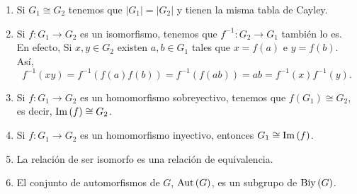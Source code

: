 \begin{observation}
\begin{enumerate}
\item Si $\displaystyle G_{1} \cong G_{2} $ tenemos que $\displaystyle \left|G_{1}\right| = \left|G_{2}\right| $ y tienen la misma tabla de Cayley. 
\item Si $\displaystyle f: G_{1} \to G_{2} $ es un isomorfismo, tenemos que $\displaystyle f^{-1} : G_{2} \to G_{1} $ también lo es. En efecto, Si $\displaystyle x,y \in G_{2} $ existen $\displaystyle a,b \in G_{1} $ tales que $\displaystyle x = f\left(a\right) $ e $\displaystyle y = f\left(b\right) $. Así, 
	\[f^{-1}\left(xy\right) = f^{-1}\left(f\left(a\right)f\left(b\right)\right) = f^{-1}\left(f\left(ab\right)\right) = ab = f^{-1}\left(x\right)f^{-1}\left(y\right).\]
	
\item Si $\displaystyle f: G_{1} \to G_{2} $ es un homomorfismo sobreyectivo, tenemos que $\displaystyle f\left(G_{1}\right) \cong G_{2} $, es decir, $\displaystyle \operatorname{Im}\left(f\right)\cong G_{2} $.
\item Si $\displaystyle f: G_{1} \to G_{2} $ es un homomorfismo inyectivo, entonces $\displaystyle G_{1} \cong \operatorname{Im}\left(f\right) $.
\item La relación de ser isomorfo es una relación de equivalencia.
\item El conjunto de automorfismos de $\displaystyle G $, $\displaystyle \operatorname{Aut}\left(G\right) $, es un subgrupo de $\displaystyle \operatorname{Biy}\left(G\right) $.
\end{enumerate}
\end{observation}
